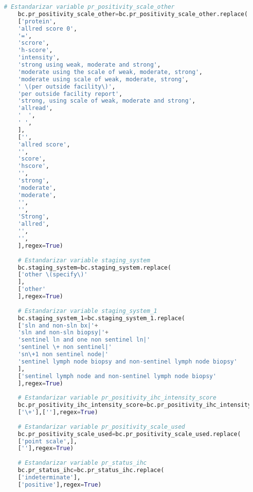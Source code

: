 \begin{lstlisting}[basicstyle=\scriptsize,language=Python, label=estandarizacion, caption=Estandarización de datos genómicos en Python.]
	# Estandarizar variable pr_positivity_scale_other
	bc.pr_positivity_scale_other=bc.pr_positivity_scale_other.replace(
	['protein',
	'allred score 0',
	'=',
	'scrore',
	'h-score',
	'intensity',
	'strong using weak, moderate and strong',
	'moderate using the scale of weak, moderate, strong',
	'moderate using scale of weak, moderate, strong',
	' \(per outside facility\)',
	'per outside facility report',
	'strong, using scale of weak, moderate and strong',
	'allread',
	'  ',
	' ',
	],
	['',
	'allred score',
	'',
	'score',
	'hscore',
	'',
	'strong',
	'moderate',
	'moderate',
	'',
	'',
	'Strong',
	'allred',
	'',
	'',
	],regex=True)
	
	# Estandarizar variable staging_system
	bc.staging_system=bc.staging_system.replace(
	['other \(specify\)'
	],
	['other'
	],regex=True)
	
	# Estandarizar variable staging_system_1
	bc.staging_system_1=bc.staging_system_1.replace(
	['sln and non-sln bx|'+
	'sln and non-sln biopsy|'+
	'sentinel ln and one non sentinel ln|'
	'sentinel \+ non sentinel|'
	'sn\+1 non sentinel node|'
	'sentinel lymph node biopsy and non-sentinel lymph node biopsy'
	],
	['sentinel lymph node and non-sentinel lymph node biopsy'
	],regex=True)
	
	# Estandarizar variable pr_positivity_ihc_intensity_score
	bc.pr_positivity_ihc_intensity_score=bc.pr_positivity_ihc_intensity_score.replace(
	['\+'],[''],regex=True)
	
	# Estandarizar variable pr_positivity_scale_used
	bc.pr_positivity_scale_used=bc.pr_positivity_scale_used.replace(
	['point scale',],
	[''],regex=True)
	
	# Estandarizar variable pr_status_ihc
	bc.pr_status_ihc=bc.pr_status_ihc.replace(
	['indeterminate'],
	['positive'],regex=True)
	

\end{lstlisting}
